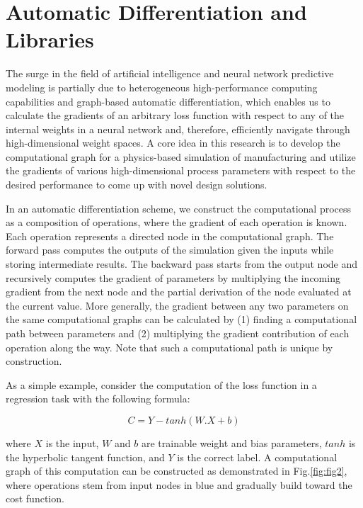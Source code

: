\documentclass{article}
\begin{document}
\section{Automatic Differentiation and Libraries}

The surge in the field of artificial intelligence and neural network predictive modeling is partially due to heterogeneous high-performance computing capabilities and graph-based automatic differentiation, which enables us to calculate the gradients of an arbitrary loss function with respect to any of the internal weights in a neural network and, therefore, efficiently navigate through high-dimensional weight spaces. A core idea in this research is to develop the computational graph for a physics-based simulation of manufacturing and utilize the gradients of various high-dimensional process parameters with respect to the desired performance to come up with novel design solutions.

In an automatic differentiation scheme, we construct the computational process as a composition of operations, where the gradient of each operation is known. Each operation represents a directed node in the computational graph. The forward pass computes the outputs of the simulation given the inputs while storing intermediate results. The backward pass starts from the output node and recursively computes the gradient of parameters by multiplying the incoming gradient from the next node and the partial derivation of the node evaluated at the current value. More generally, the gradient between any two parameters on the same computational graphs can be calculated by (1) finding a computational path between parameters and (2) multiplying the gradient contribution of each operation along the way. Note that such a computational path is unique by construction.

As a simple example, consider the computation of the loss function in a regression task with the following formula: 

\begin{equation} \label{eq:1}
C = Y - tanh(W.X + b)
\end{equation}

where $X$ is the input, $W$ and $b$ are trainable weight and bias parameters, $tanh$ is the hyperbolic tangent function, and $Y$ is the correct label. A computational graph of this computation can be constructed as demonstrated in Fig.\ref{fig:fig2}, where operations stem from input nodes in blue and gradually build toward the cost function.
\end{document}
